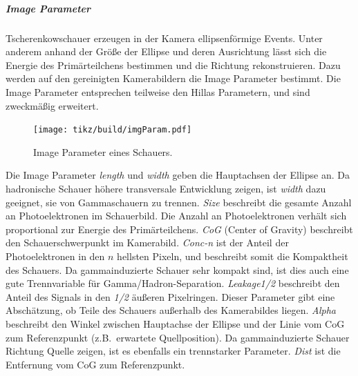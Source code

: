 \subparagraph{Image Parameter}%
\label{spar:image_parameter}

Tscherenkowschauer erzeugen in der Kamera ellipsenförmige Events.
Unter anderem anhand der Größe der Ellipse und deren Ausrichtung
lässt sich die Energie des
Primärteilchens bestimmen und die Richtung rekonstruieren.
Dazu werden auf den gereinigten Kamerabildern die Image Parameter bestimmt.
Die Image Parameter entsprechen teilweise den Hillas Parametern,
und sind zweckmäßig erweitert.


\begin{figure}
  \centering
  \texttt{[image: tikz/build/imgParam.pdf]}
  \caption{Image Parameter eines Schauers.}%
  \label{fig:hillas}
\end{figure}

Die Image Parameter \textit{length} und \textit{width} geben die Hauptachsen
der Ellipse an.
Da hadronische Schauer höhere transversale Entwicklung zeigen, ist
\textit{width} dazu geeignet, sie von Gammaschauern zu trennen.
\textit{Size} beschreibt die gesamte Anzahl an Photoelektronen im Schauerbild.
Die Anzahl an Photoelektronen verhält sich proportional zur Energie des
Primärteilchens.
\textit{CoG} (Center of Gravity) beschreibt den Schauerschwerpunkt im Kamerabild.
\textit{Conc-n} ist der Anteil der Photoelektronen in den $n$ hellsten Pixeln,
und beschreibt somit die Kompaktheit des Schauers.
Da gammainduzierte Schauer sehr kompakt sind, ist dies auch eine gute
Trennvariable für Gamma/Hadron-Separation.
\textit{Leakage1/2} beschreibt den Anteil des Signals in den \textit{1/2} äußeren
Pixelringen.
Dieser Parameter gibt eine Abschätzung,
ob Teile des Schauers außerhalb des Kamerabildes liegen.
\textit{Alpha} beschreibt den Winkel zwischen Hauptachse der Ellipse und
der Linie vom CoG zum Referenzpunkt (z.B.\ erwartete Quellposition).
Da gammainduzierte Schauer Richtung Quelle zeigen,
ist es ebenfalls ein trennstarker Parameter.
\textit{Dist} ist die Entfernung vom CoG zum Referenzpunkt.
